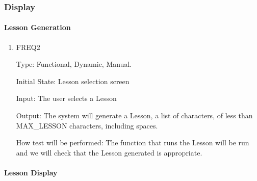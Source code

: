 \documentclass[12pt, titlepage]{article}
\begin{document}
\subsubsection{Display}
\paragraph{Lesson Generation}

\begin{enumerate}

\item{FREQ2\\}

Type: Functional, Dynamic, Manual.
					
Initial State: Lesson selection screen
					
Input: The user selects a Lesson
					
Output: The system will generate a Lesson, a list of characters, of less than MAX\_LESSON characters, including spaces.
					
How test will be performed: The function that runs the Lesson will be run and we will check that the Lesson generated is appropriate. 

\end{enumerate}

\paragraph{Lesson Display}
\end{document}
